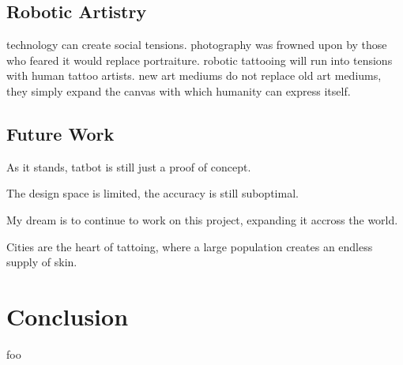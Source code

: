 \documentclass[11pt]{article}
\begin{document}
\subsection{Robotic Artistry}

technology can create social tensions.
photography was frowned upon by those who feared it would replace portraiture.
robotic tattooing will run into tensions with human tattoo artists.
new art mediums do not replace old art mediums, they simply expand the canvas with which humanity can express itself.

\subsection{Future Work}

As it stands, tatbot is still just a proof of concept.

The design space is limited, the accuracy is still suboptimal.

My dream is to continue to work on this project, expanding it accross the world.

Cities are the heart of tattoing, where a large population creates an endless supply of skin.

\section{Conclusion}

foo



\end{document}
